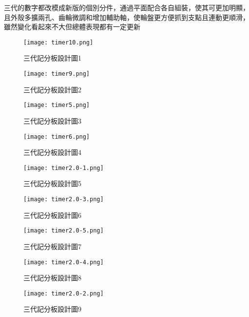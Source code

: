 三代的數字都改模成新版的個別分件，通過平面配合各自組裝，使其可更加明顯，且外殼多擴兩孔、齒輪微調和增加輔助軸，使輪盤更方便抓到支點且連動更順滑，雖然變化看起來不大但總體表現都有一定更新


\begin{figure}
  \centering
  \texttt{[image: timer10.png]}
  \caption{三代記分板設計圖1}
  \label{fig:example}
\end{figure}


\begin{figure}
  \centering
  \texttt{[image: timer9.png]}
  \caption{三代記分板設計圖2}
  \label{fig:example}
\end{figure}


\begin{figure}
  \centering
  \texttt{[image: timer5.png]}
  \caption{三代記分板設計圖3}
  \label{fig:example}
\end{figure}


\begin{figure}
  \centering
  \texttt{[image: timer6.png]}
  \caption{三代記分板設計圖4}
  \label{fig:example}
\end{figure}


\begin{figure}
  \centering
  \texttt{[image: timer2.0-1.png]}
  \caption{三代記分板設計圖5}
  \label{fig:example}
\end{figure}


\begin{figure}
  \centering
  \texttt{[image: timer2.0-3.png]}
  \caption{三代記分板設計圖6}
  \label{fig:example}
\end{figure}


\begin{figure}
  \centering
  \texttt{[image: timer2.0-5.png]}
  \caption{三代記分板設計圖7}
  \label{fig:example}
\end{figure}


\begin{figure}
  \centering
  \texttt{[image: timer2.0-4.png]}
  \caption{三代記分板設計圖8}
  \label{fig:example}
\end{figure}


\begin{figure}
  \centering
  \texttt{[image: timer2.0-2.png]}
  \caption{三代記分板設計圖9}
  \label{fig:example}
\end{figure}

